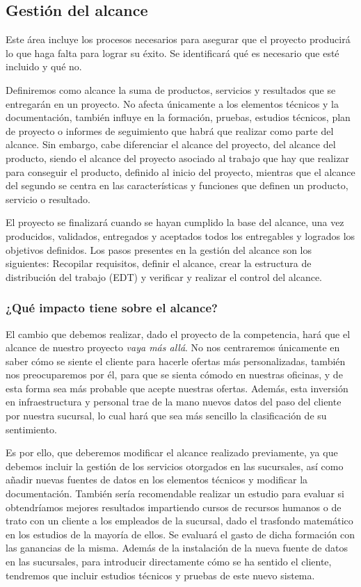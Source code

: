 \documentclass{article}
\begin{document}
\subsection{Gestión del alcance}

Este área incluye los procesos necesarios para asegurar que el proyecto producirá lo que haga falta para lograr su éxito. Se identificará qué es necesario que esté incluido y qué no.

Definiremos como alcance la suma de productos, servicios y resultados que se entregarán en un proyecto. No afecta únicamente a los elementos técnicos y la documentación, también  influye en la formación, pruebas, estudios técnicos, plan de proyecto o informes de seguimiento que habrá que realizar como parte del alcance. Sin embargo, cabe diferenciar el alcance del proyecto, del alcance del producto, siendo el alcance del proyecto asociado al trabajo que hay que realizar para conseguir el producto, definido al inicio del proyecto, mientras que el alcance del segundo se centra en las características y funciones que definen un producto, servicio o resultado.

El proyecto se finalizará cuando se hayan cumplido la base del alcance, una vez producidos, validados, entregados y aceptados todos los entregables y logrados los objetivos definidos. Los pasos presentes en la gestión del alcance son los siguientes: Recopilar requisitos, definir el alcance, crear la estructura de distribución del trabajo (EDT) y verificar y realizar el control del alcance.

\subsubsection{¿Qué impacto tiene sobre el alcance?}
El cambio que debemos realizar, dado el proyecto de la competencia, hará que el alcance de nuestro proyecto \textit{vaya más allá}. No nos centraremos únicamente en saber cómo se siente el cliente para hacerle ofertas más personalizadas, también nos preocuparemos por él, para que se sienta cómodo en nuestras oficinas, y de esta forma sea más probable que acepte nuestras ofertas. Además, esta inversión en infraestructura y personal trae de la mano nuevos datos del paso del cliente por nuestra sucursal, lo cual hará que sea más sencillo la clasificación de su sentimiento.

Es por ello, que deberemos modificar el alcance realizado previamente, ya que debemos incluir la gestión de los servicios otorgados en las sucursales, así como añadir nuevas fuentes de datos en los elementos técnicos y modificar la documentación. También sería recomendable realizar un estudio para evaluar si obtendríamos mejores resultados impartiendo cursos de recursos humanos o de trato con un cliente a los empleados de la sucursal, dado el trasfondo matemático en los estudios de la mayoría de ellos. Se evaluará el gasto de dicha formación con las ganancias de la misma. Además de la instalación de la nueva fuente de datos en las sucursales, para introducir directamente cómo se ha sentido el cliente, tendremos que incluir estudios técnicos y pruebas de este nuevo sistema.
\end{document}
